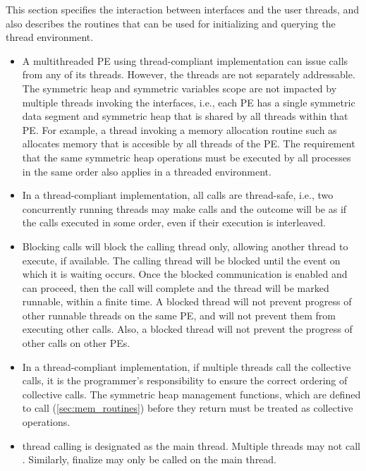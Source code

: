 This section specifies the interaction between \openshmem{} interfaces and the
user threads, and also describes the routines that can be used for initializing and 
querying the thread environment.
 

\begin{itemize}

\item
A multithreaded \openshmem{} \ac{PE} using thread-compliant implementation can issue
\openshmem{} calls from  any of its threads. However, the threads
are not separately addressable. The symmetric heap and symmetric variables scope
are not impacted by multiple threads invoking the
\openshmem{} interfaces, i.e., 
each \ac{PE} has a single symmetric data segment and symmetric heap that is shared by
all threads within that \ac{PE}.  For example, a thread invoking a memory allocation
routine such as  
allocates memory that is accesible by all threads of the \ac{PE}. 
The requirement that the same symmetric heap operations must
be executed by all processes in the same order also applies in a threaded
environment. 
                                    	
\item In a thread-compliant implementation, 
all \openshmem{} calls are thread-safe, i.e., two concurrently running threads
may make \openshmem{} calls and the outcome will be as if the calls executed in
some order, even if their execution is interleaved.

\item Blocking \openshmem{} calls will block the calling thread only, allowing another
thread to execute, if available. The calling thread will be blocked until the
event on which it is waiting occurs. Once the blocked communication is enabled
and can proceed, then the call will complete and the thread will be marked
runnable, within a finite time. A blocked thread will not prevent progress of
other runnable threads on the same \ac{PE}, and will not prevent them from
executing other \openshmem{} calls. Also, a blocked thread will not prevent the
progress of other \openshmem{} calls on other \acp{PE}. 
 
\item
In a thread-compliant implementation, if multiple threads call the collective
calls, it is the programmer's responsibility to ensure the correct ordering of
collective calls.  The symmetric heap management functions, which are defined to call
(\ref{sec:mem_routines}) before they return 
must be treated as collective operations.

\item
\openshmem{} thread calling  is designated as the main thread.
Multiple threads may not call . Similarly, \openshmem{} finalize
may only be called on the main thread.

\end{itemize} 
 
